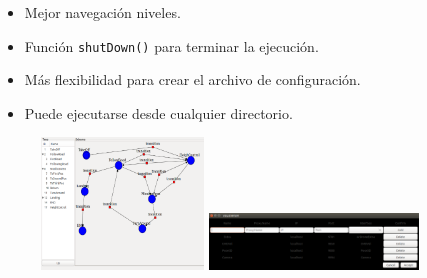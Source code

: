 \documentclass[notes,slidesec,a4]{seminar}
\begin{document}
\begin{hslide}

\begin{minipage}[t]{0.45\textwidth}
\begin{center}
	\begin{itemize}
	\item Mejor navegación niveles.
	\item Función \texttt{shutDown()} para terminar la ejecución.
	\item Más flexibilidad para crear el archivo de configuración.
	\item Puede ejecutarse desde cualquier directorio.
	\end{itemize}
\end{center}
\end{minipage}\hfill
\begin{minipage}[t]{0.45\textwidth}
\begin{center}
	\begin{figure}
		\includegraphics[height=3.5cm]{imgs/editor.png}
		\includegraphics[height=1.5cm]{imgs/configFiles.png}
	\end{figure}
\end{center}
\end{minipage}

\end{hslide}

\end{document}
